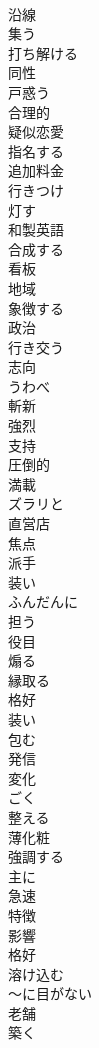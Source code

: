 \documentclass[8pt]{extreport}
\begin{document}
\begin{CJK}{UTF8}{min}
\\	沿線
\\	集う
\\	打ち解ける
\\	同性
\\	戸惑う
\\	合理的
\\	疑似恋愛
\\	指名する
\\	追加料金
\\	行きつけ
\\	灯す
\\	和製英語
\\	合成する
\\	看板
\\	地域
\\	象徴する
\\	政治
\\	行き交う
\\	志向
\\	うわべ
\\	斬新
\\	強烈
\\	支持
\\	圧倒的
\\	満載
\\	ズラリと
\\	直営店
\\	焦点
\\	派手
\\	装い
\\	ふんだんに
\\	担う
\\	役目
\\	煽る
\\	縁取る
\\	格好
\\	装い
\\	包む
\\	発信
\\	変化
\\	ごく
\\	整える
\\	薄化粧
\\	強調する
\\	主に
\\	急速
\\	特徴
\\	影響
\\	格好
\\	溶け込む
\\	～に目がない
\\	老舗
\\	築く

\end{CJK}
\end{document}
